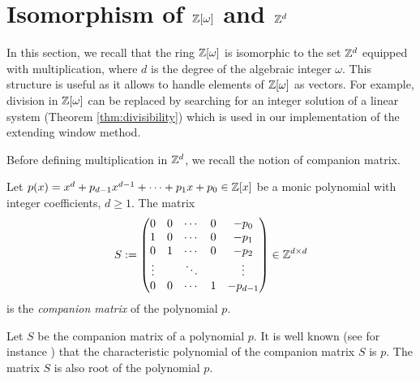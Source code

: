 


\section{\texorpdfstring{Isomorphism of $\mathbb{Z}[\omega]$ and $\mathbb{Z}^{d}$}{Isomorphism of Z[omega] and Zd}}
In this section, we recall that  the ring $\mathbb{Z}[\omega]$ is isomorphic to the set $\mathbb{Z}^d$ equipped with multiplication, where $d$ is the degree of the algebraic integer $\omega$. This structure is useful as it allows to handle elements of $\mathbb{Z}[\omega]$ as vectors. For example, division in $\mathbb{Z}[\omega]$ can be replaced by searching for an integer solution of a linear system (Theorem \ref{thm:divisibility}) which is used in our implementation of the extending window method.


Before defining multiplication in $\mathbb{Z}^d$, we recall the notion of companion matrix. 
\begin{defn}
Let  $p(x)=x^d +p_{d-1}x^{d-1}+ \cdots + p_1 x+p_0 \in \mathbb{Z}[x]$ be a monic polynomial with integer coefficients, $d\geq 1$. The matrix 
$$
S := \begin{pmatrix}
            0 & 0 & \cdots & 0 & -p_0 \\
            1 & 0 & \cdots & 0 & -p_1 \\
            0 & 1 & \cdots & 0 & -p_2 \\
            \vdots &   & \ddots & & \vdots \\
            0 & 0 & \cdots & 1 & -p_{d-1} 
            \end{pmatrix} \in \mathbb{Z}^{d\times d}
$$
is the \emph{companion matrix} of the polynomial $p$.
\end{defn}
Let $S$ be the companion matrix of a polynomial $p$. It is well known (see for instance \cite{horn}) that the characteristic polynomial of the companion matrix $S$ is $p$. The matrix $S$ is also root of the polynomial $p$.


